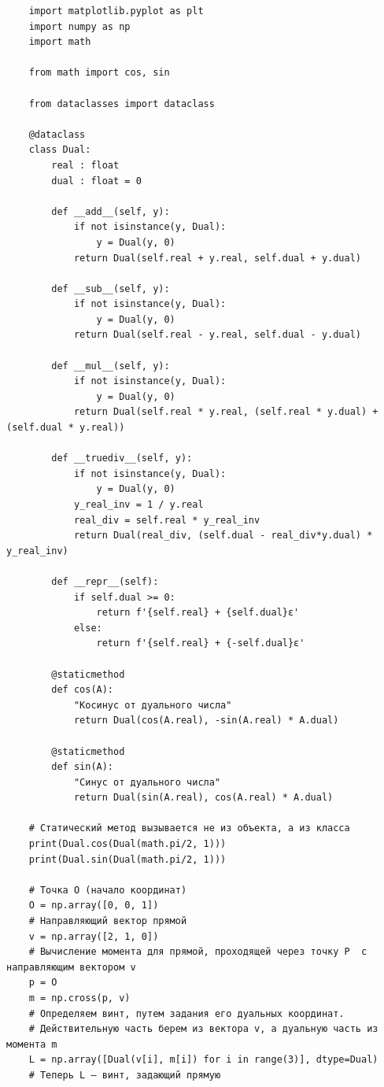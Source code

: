 \begin{verbatim}
    import matplotlib.pyplot as plt
    import numpy as np
    import math

    from math import cos, sin

    from dataclasses import dataclass

    @dataclass
    class Dual:
        real : float
        dual : float = 0

        def __add__(self, y):
            if not isinstance(y, Dual):
                y = Dual(y, 0)
            return Dual(self.real + y.real, self.dual + y.dual)

        def __sub__(self, y):
            if not isinstance(y, Dual):
                y = Dual(y, 0)
            return Dual(self.real - y.real, self.dual - y.dual)

        def __mul__(self, y):
            if not isinstance(y, Dual):
                y = Dual(y, 0)
            return Dual(self.real * y.real, (self.real * y.dual) + (self.dual * y.real))

        def __truediv__(self, y):
            if not isinstance(y, Dual):
                y = Dual(y, 0)
            y_real_inv = 1 / y.real
            real_div = self.real * y_real_inv
            return Dual(real_div, (self.dual - real_div*y.dual) * y_real_inv)

        def __repr__(self):
            if self.dual >= 0:
                return f'{self.real} + {self.dual}ε'
            else:
                return f'{self.real} + {-self.dual}ε'

        @staticmethod
        def cos(A):
            "Косинус от дуального числа"
            return Dual(cos(A.real), -sin(A.real) * A.dual)

        @staticmethod
        def sin(A):
            "Синус от дуального числа"
            return Dual(sin(A.real), cos(A.real) * A.dual)

    # Статический метод вызывается не из объекта, а из класса
    print(Dual.cos(Dual(math.pi/2, 1)))
    print(Dual.sin(Dual(math.pi/2, 1)))

    # Точка O (начало координат)
    O = np.array([0, 0, 1])
    # Направляющий вектор прямой
    v = np.array([2, 1, 0])
    # Вычисление момента для прямой, проходящей через точку P  с направляющим вектором v
    p = O
    m = np.cross(p, v)
    # Определяем винт, путем задания его дуальных координат.
    # Действительную часть берем из вектора v, а дуальную часть из момента m
    L = np.array([Dual(v[i], m[i]) for i in range(3)], dtype=Dual)
    # Теперь L — винт, задающий прямую


\end{verbatim}
